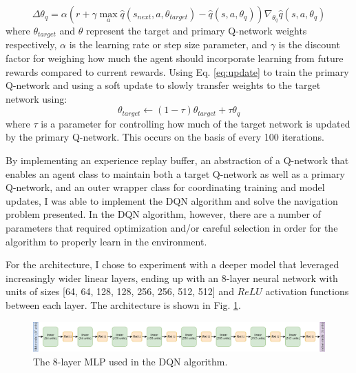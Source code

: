 \documentclass[11pt]{article}
\begin{document}
\begin{equation} \label{eq:update}
	\Delta \theta_{q} = \alpha (r + \gamma \max_{a}{\hat{q}(s_{next}, a, \theta_{target})} - \hat{q}(s, a, \theta_{q}))\nabla_{\theta_{q}}\hat{q}(s, a, \theta_{q})
\end{equation}
where $\theta_{target}$ and $\theta$ represent the target and primary Q-network weights respectively, $\alpha$ is the learning rate or step size parameter, and $\gamma$ is the discount factor for weighing how much the agent should incorporate learning from future rewards compared to current rewards. Using Eq. \ref{eq:update} to train the primary Q-network and using a soft update to slowly transfer weights to the target network using:
\begin{equation}\label{eq:soft-update}
\theta_{target} \leftarrow (1 - \tau)\theta_{target} + \tau\theta_{q}
\end{equation}
where $\tau$ is a parameter for controlling how much of the target network is updated by the primary Q-network. This occurs on the basis of every 100 iterations.

By implementing an experience replay buffer, an abstraction of a Q-network that enables an agent class to maintain both a target Q-network as well as a primary Q-network, and an outer wrapper class for coordinating training and model updates, I was able to implement the DQN algorithm and solve the navigation problem presented. In the DQN algorithm, however, there are a number of parameters that required optimization and/or careful selection in order for the algorithm to properly learn in the environment.

For the architecture, I chose to experiment with a deeper model that leveraged increasingly wider linear layers,
 ending up with an 8-layer neural network with units of sizes [64, 64, 128, 128, 
 256, 256, 512, 512] and $ReLU$ activation functions between each layer. The architecture is shown in Fig. \ref{fig:dqn-architecture}.

 \FloatBarrier
 
 \begin{figure}[!ht]
 	\centering
 	\includegraphics[width=\linewidth]{images/dqn-architecture.png}
 	\caption{The 8-layer MLP used in the DQN algorithm.}
 	\label{fig:dqn-architecture}
 \end{figure}
 
\end{document}
